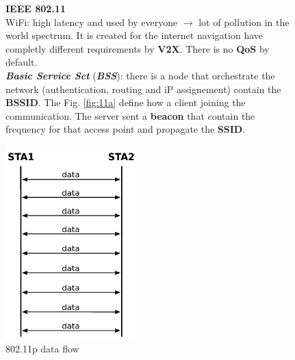 \begin{figure}[h]
\begin{minipage}[t]{0.45\textwidth}
        \begin{flushleft}
            \textbf{IEEE 802.11} \\
            WiFi: high latency and used by everyone $\rightarrow$ lot of pollution in the world spectrum. It is created for the internet navigation have completly different requirements by \textbf{V2X}. There is no \textbf{QoS} by default. \\
            \textbf{\textit{Basic Service Set}} (\textbf{\textit{BSS}}): there is a node that orchestrate the network (authentication, routing and iP assignement) contain the \textbf{BSSID}. The Fig. \ref{fig:11a} define how a client joining the communication. The server sent a \textbf{beacon} that contain the frequency for that access point and propagate the \textbf{SSID}.
        \end{flushleft}
    \end{minipage}
    \begin{minipage}[t]{0.45\textwidth}
        \centering
        \includegraphics[width=0.45\textwidth]{img/11p}
        \caption{802.11p data flow}
        \label{fig:11p}


\end{minipage}
\end{figure}
